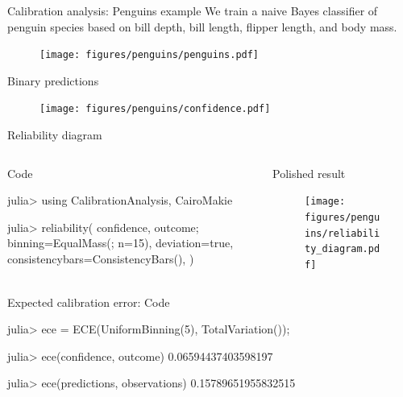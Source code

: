 \documentclass[aspectratio=169,hyperref={pdfpagelabels=false,pageanchor=false,bookmarks=false}]{beamer}
\begin{document}
\begin{frame}{Calibration analysis: Penguins example}
  We train a naive Bayes classifier of penguin species based on bill depth, bill length, flipper length, and body mass.
  \begin{figure}
    \centering
    \texttt{[image: figures/penguins/penguins.pdf]}
  \end{figure}
\end{frame}

\begin{frame}{Binary predictions}
  \begin{figure}
    \centering
    \texttt{[image: figures/penguins/confidence.pdf]}
  \end{figure}
\end{frame}

\begin{frame}[fragile]{Reliability diagram}
  \begin{columns}[t]
    \begin{column}{0.5\textwidth}
      \begin{block}{Code}
        \begin{juliaconsnippet}
julia> using CalibrationAnalysis, CairoMakie

julia> reliability(
           confidence,
           outcome;
           binning=EqualMass(; n=15),
           deviation=true,
           consistencybars=ConsistencyBars(),
      )
        \end{juliaconsnippet}
      \end{block}
    \end{column}
    \begin{column}{0.5\textwidth}
      \begin{block}{Polished result}
        \begin{figure}
          \centering
          \texttt{[image: figures/penguins/reliability\_diagram.pdf]}
        \end{figure}
      \end{block}
    \end{column}
  \end{columns}
\end{frame}

\begin{frame}[fragile]{Expected calibration error: Code}
  \begin{juliaconsnippet}
julia> ece = ECE(UniformBinning(5), TotalVariation());

julia> ece(confidence, outcome)
0.06594437403598197

julia> ece(predictions, observations)
0.15789651955832515
  \end{juliaconsnippet}
\end{frame}
\end{document}
